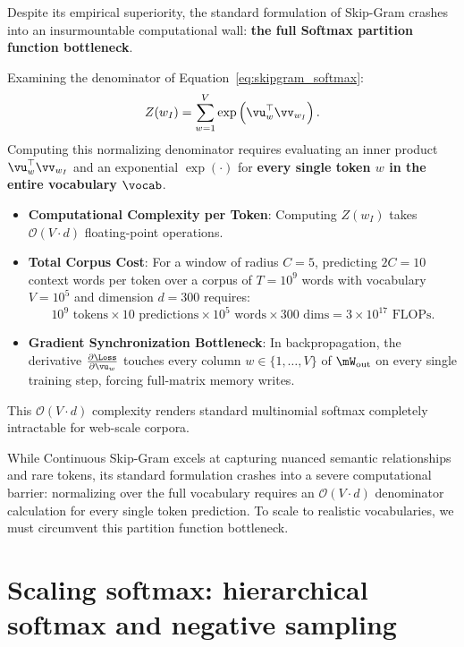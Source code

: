 \documentclass[../../main.tex]{subfiles}
\begin{document}
Despite its empirical superiority, the standard formulation of Skip-Gram crashes into an insurmountable computational wall: \textbf{the full Softmax partition function bottleneck}.

Examining the denominator of Equation~\eqref{eq:skipgram_softmax}:
\begin{equation}
\label{eq:partition_function}
Z(w_I) = \sum_{w=1}^V \exp\left( \vu_w^\top \vv_{w_I} \right).
\end{equation}
Computing this normalizing denominator requires evaluating an inner product $\vu_w^\top \vv_{w_I}$ and an exponential $\exp(\cdot)$ for \textbf{every single token $w$ in the entire vocabulary $\vocab$}.
\begin{itemize}
    \item \textbf{Computational Complexity per Token}: Computing $Z(w_I)$ takes $\mathcal{O}(V \cdot d)$ floating-point operations.
    \item \textbf{Total Corpus Cost}: For a window of radius $C = 5$, predicting $2C = 10$ context words per token over a corpus of $T = 10^9$ words with vocabulary $V = 10^5$ and dimension $d = 300$ requires:
    \begin{equation}
    \label{eq:flops_wall}
    10^9 \text{ tokens} \times 10 \text{ predictions} \times 10^5 \text{ words} \times 300 \text{ dims} = 3 \times 10^{17} \text{ FLOPs}.
    \end{equation}
    \item \textbf{Gradient Synchronization Bottleneck}: In backpropagation, the derivative $\frac{\partial \Loss}{\partial \vu_w}$ touches every column $w \in \{1, \dots, V\}$ of $\mW_{\text{out}}$ on every single training step, forcing full-matrix memory writes.
\end{itemize}
This $\mathcal{O}(V \cdot d)$ complexity renders standard multinomial softmax completely intractable for web-scale corpora.

While Continuous Skip-Gram excels at capturing nuanced semantic relationships and rare tokens, its standard formulation crashes into a severe computational barrier: normalizing over the full vocabulary requires an $\mathcal{O}(V \cdot d)$ denominator calculation for every single token prediction. To scale to realistic vocabularies, we must circumvent this partition function bottleneck.

\section{Scaling softmax: hierarchical softmax and negative sampling}
\label{sec:scaling_softmax}
\end{document}
